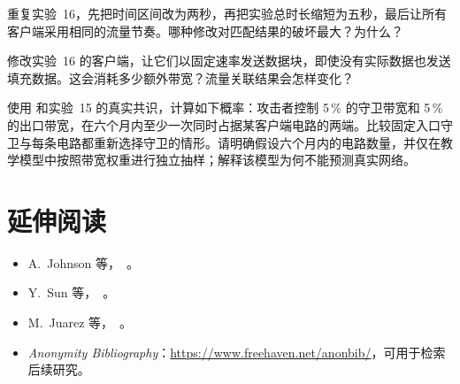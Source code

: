 \begin{esercizio}[2]\label{es:26-bin}
重复实验~16，先把时间区间改为两秒，再把实验总时长缩短为五秒，最后让所有客户端采用相同的流量节奏。哪种修改对匹配结果的破坏最大？为什么？
\end{esercizio}

\begin{esercizio}[2]\label{es:26-difesa}
修改实验~16 的客户端，让它们以固定速率发送数据块，即使没有实际数据也发送填充数据。这会消耗多少额外带宽？流量关联结果会怎样变化？
\end{esercizio}

\begin{esercizio}[3]\label{es:26-probabilita}
使用  和实验~15 的真实共识，计算如下概率：攻击者控制 5\,\% 的守卫带宽和 5\,\% 的出口带宽，在六个月内至少一次同时占据某客户端电路的两端。比较固定入口守卫与每条电路都重新选择守卫的情形。请明确假设六个月内的电路数量，并仅在教学模型中按照带宽权重进行独立抽样；解释该模型为何不能预测真实网络。
\end{esercizio}

\section*{延伸阅读}
\begin{itemize}
  \item A.~Johnson 等，~\cite{johnson2013users}。
  \item Y.~Sun 等，~\cite{sun2015raptor}。
  \item M.~Juarez 等，~\cite{juarez2014critical}。
  \item \emph{Anonymity Bibliography}：\url{https://www.freehaven.net/anonbib/}，可用于检索后续研究。
\end{itemize}
